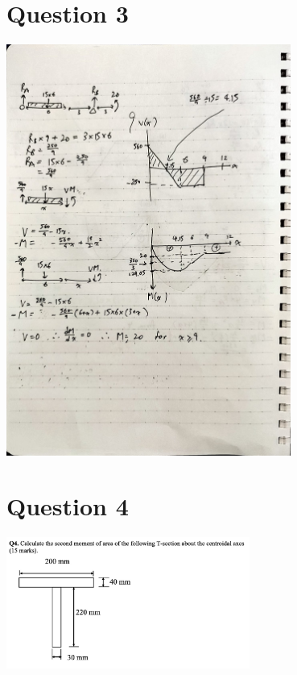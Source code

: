 \documentclass{article}
\begin{document}
\section*{Question 3}
\includegraphics[width=0.7\textwidth]{img/A3Q3.jpeg}


\section*{Question 4}
\includegraphics[width=0.6\textwidth]{img/A3Q4.jpg}
\end{document}

